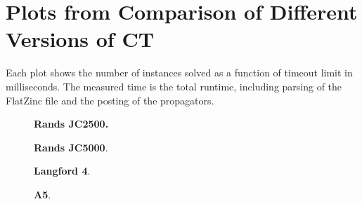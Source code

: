 \documentclass[a4paper,11pt]{article}
\newcommand{\Chapref}[1]{Section~\ref{#1}}
\numberwithin{equation}{section}
\begin{document}






\appendix
\section{Plots from Comparison of Different Versions of CT}
\label{app:compare-ct}

Each plot shows the number of instances solved as a function
of timeout limit in milliseconds. The measured time is the total
runtime, including parsing of the FlatZinc file and the posting of
the propagators.


\begin{figure}[H]
  \begin{minipage}[b][8cm][s]{0.45\textwidth}
    \centering
    \vfill
    \begin{tikzpicture}[scale=0.9]
      
    \end{tikzpicture}
    \vfill
    \caption{\textbf{Rands JC2500.} }
    \vspace{\baselineskip}
  \end{minipage}\qquad
  \begin{minipage}[b][8cm][s]{0.45\textwidth}
    \centering
    \vfill
    \begin{tikzpicture}[scale=0.9]
      
    \end{tikzpicture}
    \vfill
    \caption{\textbf{Rands JC5000}. }
    \vspace{\baselineskip}
  \end{minipage}\qquad
\end{figure}

\begin{figure}
  \begin{minipage}[b][8cm][s]{0.45\textwidth}
    \centering
    \vfill
    \begin{tikzpicture}[scale=0.9]
      
    \end{tikzpicture}
    \vfill
    \caption{\textbf{Langford 4}.}
    \vspace{\baselineskip}
  \end{minipage}\qquad
  \begin{minipage}[b][8cm][s]{0.45\textwidth}
    \centering
    \vfill
    \begin{tikzpicture}[scale=0.9]
      
    \end{tikzpicture}
    \vfill
    \caption{\textbf{A5}.}
    \vspace{\baselineskip}
  \end{minipage}\qquad

\end{figure}
\end{document}
